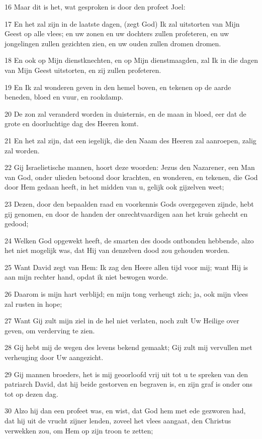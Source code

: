 \par 16 Maar dit is het, wat gesproken is door den profeet Joel:
\par 17 En het zal zijn in de laatste dagen, (zegt God) Ik zal uitstorten van Mijn Geest op alle vlees; en uw zonen en uw dochters zullen profeteren, en uw jongelingen zullen gezichten zien, en uw ouden zullen dromen dromen.
\par 18 En ook op Mijn dienstknechten, en op Mijn dienstmaagden, zal Ik in die dagen van Mijn Geest uitstorten, en zij zullen profeteren.
\par 19 En Ik zal wonderen geven in den hemel boven, en tekenen op de aarde beneden, bloed en vuur, en rookdamp.
\par 20 De zon zal veranderd worden in duisternis, en de maan in bloed, eer dat de grote en doorluchtige dag des Heeren komt.
\par 21 En het zal zijn, dat een iegelijk, die den Naam des Heeren zal aanroepen, zalig zal worden.
\par 22 Gij Israelietische mannen, hoort deze woorden: Jezus den Nazarener, een Man van God, onder ulieden betoond door krachten, en wonderen, en tekenen, die God door Hem gedaan heeft, in het midden van u, gelijk ook gijzelven weet;
\par 23 Dezen, door den bepaalden raad en voorkennis Gods overgegeven zijnde, hebt gij genomen, en door de handen der onrechtvaardigen aan het kruis gehecht en gedood;
\par 24 Welken God opgewekt heeft, de smarten des doods ontbonden hebbende, alzo het niet mogelijk was, dat Hij van denzelven dood zou gehouden worden.
\par 25 Want David zegt van Hem: Ik zag den Heere allen tijd voor mij; want Hij is aan mijn rechter hand, opdat ik niet bewogen worde.
\par 26 Daarom is mijn hart verblijd; en mijn tong verheugt zich; ja, ook mijn vlees zal rusten in hope;
\par 27 Want Gij zult mijn ziel in de hel niet verlaten, noch zult Uw Heilige over geven, om verderving te zien.
\par 28 Gij hebt mij de wegen des levens bekend gemaakt; Gij zult mij vervullen met verheuging door Uw aangezicht.
\par 29 Gij mannen broeders, het is mij geoorloofd vrij uit tot u te spreken van den patriarch David, dat hij beide gestorven en begraven is, en zijn graf is onder ons tot op dezen dag.
\par 30 Alzo hij dan een profeet was, en wist, dat God hem met ede gezworen had, dat hij uit de vrucht zijner lenden, zoveel het vlees aangaat, den Christus verwekken zou, om Hem op zijn troon te zetten;
